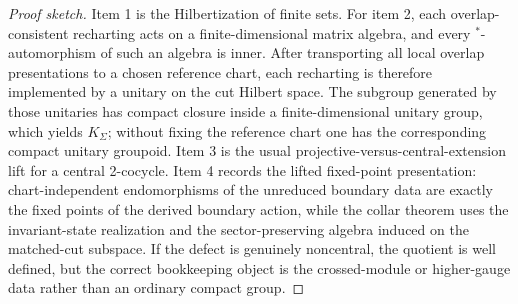 \documentclass[11pt]{article}
\begin{document}
\begin{proof}[Proof sketch]
Item 1 is the Hilbertization of finite sets. For item 2, each overlap-consistent recharting acts on a finite-dimensional matrix algebra, and every \(^*\)-automorphism of such an algebra is inner. After transporting all local overlap presentations to a chosen reference chart, each recharting is therefore implemented by a unitary on the cut Hilbert space. The subgroup generated by those unitaries has compact closure inside a finite-dimensional unitary group, which yields \(K_\Sigma\); without fixing the reference chart one has the corresponding compact unitary groupoid. Item 3 is the usual projective-versus-central-extension lift for a central 2-cocycle. Item 4 records the lifted fixed-point presentation: chart-independent endomorphisms of the unreduced boundary data are exactly the fixed points of the derived boundary action, while the collar theorem uses the invariant-state realization and the sector-preserving algebra induced on the matched-cut subspace. If the defect is genuinely noncentral, the quotient is well defined, but the correct bookkeeping object is the crossed-module or higher-gauge data rather than an ordinary compact group.
\end{proof}
\end{document}

